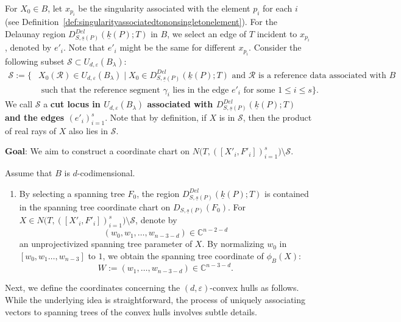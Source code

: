 \documentclass{compositio}
\numberwithin{equation}{section}
\numberwithin{figure}{section}
\theoremstyle{definition}
\theoremstyle{plain}
\begin{document}
{For $X_0 \in B$, let $x_{p_i}$ be the singularity associated with the element $p_i$ for each $i$ (see Definition~\ref{def:singularityassociatedtononsingletonelement}). For the Delaunay region $D_{S,\underline{s}(P)}^{Del}(\underline{k}(P);T)$ in $B$, we select an edge of $T$ incident to $x_{p_i}$, denoted by $e'_i$. Note that $e'_i$ might be the same for different $x_{p_i}$. Consider the following subset $\mathcal{S} \subset U_{d, \varepsilon}(B_\lambda)$:
\begin{equation}\label{equ:seam}
    \begin{aligned}
        \mathcal{S} := \big\{ & X_0(\mathcal{R}) \in U_{d, \varepsilon}(B_\lambda) \mid X_0 \in D_{S,\underline{s}(P)}^{Del}(\underline{k}(P);T) \text{ and $\mathcal{R}$ is a reference data  associated with $B$}
        \\ & \text{ such that the reference segment } \gamma_i \text{ lies in the edge } e'_i \text{ for some } 1\le i \le s \big\}.
    \end{aligned}
\end{equation}
We call $\mathcal{S}$ a \textbf{cut locus in $U_{d, \varepsilon}(B_\lambda)$ associated with $D_{S,\underline{s}(P)}^{Del}(\underline{k}(P);T)$ and the edges $(e'_i)_{i=1}^s$}. Note that by definition, if $X$ is in $\mathcal{S}$, then the product of real rays of $X$ also lies in $\mathcal{S}$.\newline

\noindent\textbf{Goal}: We aim to construct a coordinate chart on $N\big(T, ([X'_i, F'_i])_{i=1}^s\big) \setminus \mathcal{S}$.\newline

Assume that $B$ is $d$-codimensional.
\begin{enumerate}
\item By selecting a spanning tree $F_0$, the region $D_{S,\underline{s}(P)}^{Del}(\underline{k}(P);T)$ is contained in the spanning tree coordinate chart on $D_{S,\underline{s}(P)}(F_0)$. For~$X \in N\big(T, ([X'_i, F'_i])_{i=1}^s\big) \setminus \mathcal{S}$, denote by
$$
(w_0,w_1,\ldots,w_{n-3-d}) \in \mathbb{C}^{n-2-d}
$$
an unprojectivized spanning tree parameter of $X$. By normalizing $w_0$ in $[w_0,w_1\ldots,w_{n-3}]$ to $1$, we obtain the spanning tree coordinate of $\phi_B(X)$:
$$
W := (w_1, \ldots, w_{n-3-d}) \in \mathbb{C}^{n-3-d}.
$$
\end{enumerate}

Next, we define the coordinates concerning the $(d,\varepsilon)$-convex hulls as follows. While the underlying idea is straightforward, the process of uniquely associating vectors to spanning trees of the convex hulls involves subtle details.

}
\end{document}
